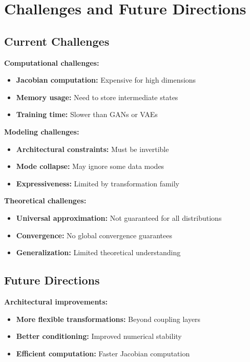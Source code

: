 \section{Challenges and Future Directions}

\subsection{Current Challenges}

\textbf{Computational challenges:}
\begin{itemize}
    \item \textbf{Jacobian computation:} Expensive for high dimensions
    \item \textbf{Memory usage:} Need to store intermediate states
    \item \textbf{Training time:} Slower than GANs or VAEs
\end{itemize}

\textbf{Modeling challenges:}
\begin{itemize}
    \item \textbf{Architectural constraints:} Must be invertible
    \item \textbf{Mode collapse:} May ignore some data modes
    \item \textbf{Expressiveness:} Limited by transformation family
\end{itemize}

\textbf{Theoretical challenges:}
\begin{itemize}
    \item \textbf{Universal approximation:} Not guaranteed for all distributions
    \item \textbf{Convergence:} No global convergence guarantees
    \item \textbf{Generalization:} Limited theoretical understanding
\end{itemize}

\subsection{Future Directions}

\textbf{Architectural improvements:}
\begin{itemize}
    \item \textbf{More flexible transformations:} Beyond coupling layers
    \item \textbf{Better conditioning:} Improved numerical stability
    \item \textbf{Efficient computation:} Faster Jacobian computation
\end{itemize}

